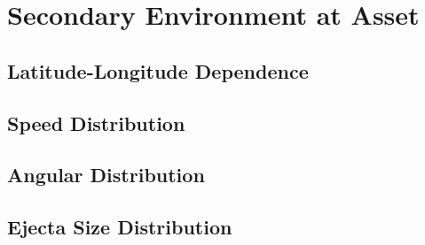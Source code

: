 \documentclass{article}
\begin{document}
\section{Secondary Environment at Asset}\label{sec:Secondary Environment}


\subsection{Latitude-Longitude Dependence}\label{ssec:env:Latitude-Longitude Dependence}

\subsection{Speed Distribution}\label{ssec:env:Speed Distribution}

\subsection{Angular Distribution}\label{ssec:env:Angular Distribution}

\subsection{Ejecta Size Distribution}\label{ssec:env:Ejecta Size Distribution}
\end{document}
